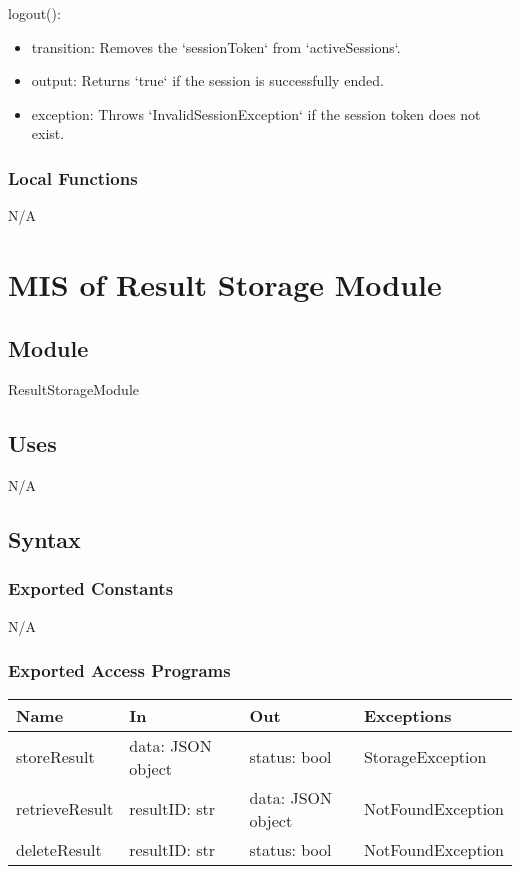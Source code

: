\documentclass[12pt, titlepage]{article}
\begin{document}
\noindent logout():
\begin{itemize}
\item transition: Removes the `sessionToken` from `activeSessions`.
\item output: Returns `true` if the session is successfully ended.
\item exception: Throws `InvalidSessionException` if the session token does not exist.
\end{itemize}

\subsubsection{Local Functions}

N/A

\section{MIS of Result Storage Module} \label{ResultStorageModule}

\subsection{Module}

ResultStorageModule

\subsection{Uses}

N/A

\subsection{Syntax}

\subsubsection{Exported Constants}

N/A

\subsubsection{Exported Access Programs}

\begin{center}
\begin{tabular}{p{3cm} p{4cm} p{4cm} p{5cm}}
\hline
\textbf{Name} & \textbf{In} & \textbf{Out} & \textbf{Exceptions} \\
\hline
storeResult & \raggedright\arraybackslash data: JSON object & \raggedright\arraybackslash status: bool & \raggedright\arraybackslash StorageException \\
\hline
retrieveResult & \raggedright\arraybackslash resultID: str & \raggedright\arraybackslash data: JSON object & \raggedright\arraybackslash NotFoundException \\
\hline
deleteResult & \raggedright\arraybackslash resultID: str & \raggedright\arraybackslash status: bool & \raggedright\arraybackslash NotFoundException \\
\hline
\end{tabular}
\end{center}
\end{document}
